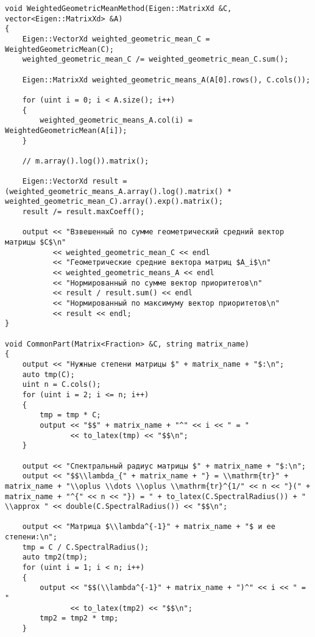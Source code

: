 \begin{lstlisting}
void WeightedGeometricMeanMethod(Eigen::MatrixXd &C, vector<Eigen::MatrixXd> &A)
{
    Eigen::VectorXd weighted_geometric_mean_C = WeightedGeometricMean(C);
    weighted_geometric_mean_C /= weighted_geometric_mean_C.sum();

    Eigen::MatrixXd weighted_geometric_means_A(A[0].rows(), C.cols());

    for (uint i = 0; i < A.size(); i++)
    {
        weighted_geometric_means_A.col(i) = WeightedGeometricMean(A[i]);
    }

    // m.array().log()).matrix();

    Eigen::VectorXd result = (weighted_geometric_means_A.array().log().matrix() * weighted_geometric_mean_C).array().exp().matrix();
    result /= result.maxCoeff();

    output << "Взвешенный по сумме геометрический средний вектор матрицы $C$\n"
           << weighted_geometric_mean_C << endl
           << "Геометрические средние вектора матриц $A_i$\n"
           << weighted_geometric_means_A << endl
           << "Нормированный по сумме вектор приоритетов\n"
           << result / result.sum() << endl
           << "Нормированный по максимуму вектор приоритетов\n"
           << result << endl;
}

void CommonPart(Matrix<Fraction> &C, string matrix_name)
{
    output << "Нужные степени матрицы $" + matrix_name + "$:\n";
    auto tmp(C);
    uint n = C.cols();
    for (uint i = 2; i <= n; i++)
    {
        tmp = tmp * C;
        output << "$$" + matrix_name + "^" << i << " = "
               << to_latex(tmp) << "$$\n";
    }

    output << "Спектральный радиус матрицы $" + matrix_name + "$:\n";
    output << "$$\\lambda_{" + matrix_name + "} = \\mathrm{tr}" + matrix_name + "\\oplus \\dots \\oplus \\mathrm{tr}^{1/" << n << "}(" + matrix_name + "^{" << n << "}) = " + to_latex(C.SpectralRadius()) + " \\approx " << double(C.SpectralRadius()) << "$$\n";

    output << "Матрица $\\lambda^{-1}" + matrix_name + "$ и ее степени:\n";
    tmp = C / C.SpectralRadius();
    auto tmp2(tmp);
    for (uint i = 1; i < n; i++)
    {
        output << "$$(\\lambda^{-1}" + matrix_name + ")^" << i << " = "
               << to_latex(tmp2) << "$$\n";
        tmp2 = tmp2 * tmp;
    }


\end{lstlisting}
